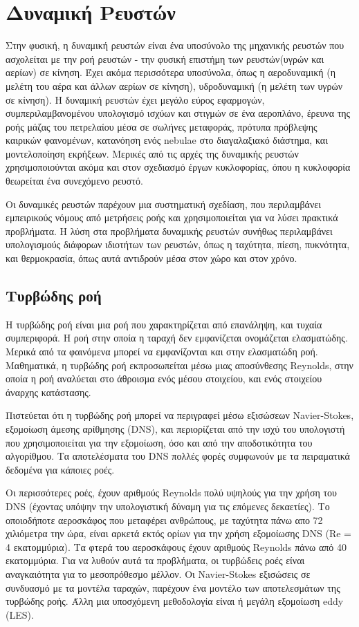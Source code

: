 \section{Δυναμική Ρευστών}
Στην φυσική, η δυναμική ρευστών είναι ένα υποσύνολο της μηχανικής ρευστών που ασχολείται με την ροή ρευστών - την φυσική επιστήμη των ρευστών(υγρών και αερίων) σε κίνηση. Έχει ακόμα περισσότερα υποσύνολα, όπως η αεροδυναμική (η μελέτη του αέρα και άλλων αερίων σε κίνηση), υδροδυναμική (η μελέτη των υγρών σε κίνηση). Η δυναμική ρευστών έχει μεγάλο εύρος εφαρμογών, συμπεριλαμβανομένου υπολογισμό ισχύων και στιγμών σε ένα αεροπλάνο, έρευνα της ροής μάζας του πετρελαίου μέσα σε σωλήνες μεταφοράς, πρότυπα πρόβλεψης καιρικών φαινομένων, κατανόηση ενός nebulae στο διαγαλαξιακό διάστημα, και μοντελοποίηση εκρήξεων. Μερικές από τις αρχές της δυναμικής ρευστών χρησιμοποιούνται ακόμα και στον σχεδιασμό έργων κυκλοφορίας, όπου η κυκλοφορία θεωρείται ένα συνεχόμενο ρευστό.

Οι δυναμικές ρευστών παρέχουν μια συστηματική σχεδίαση, που περιλαμβάνει εμπειρικούς νόμους από μετρήσεις ροής και χρησιμοποιείται για να λύσει πρακτικά προβλήματα. Η λύση στα προβλήματα δυναμικής ρευστών συνήθως περιλαμβάνει υπολογισμούς διάφορων ιδιοτήτων των ρευστών, όπως η ταχύτητα, πίεση, πυκνότητα, και θερμοκρασία, όπως αυτά αντιδρούν μέσα στον χώρο και στον χρόνο.
\subsection{Τυρβώδης ροή}
Η τυρβώδης ροή είναι μια ροή που χαρακτηρίζεται από επανάληψη, και τυχαία συμπεριφορά. Η ροή στην οποία η ταραχή δεν εμφανίζεται ονομάζεται ελασματώδης. Μερικά από τα φαινόμενα μπορεί να εμφανίζονται και στην ελασματώδη ροή. Μαθηματικά, η τυρβώδης ροή εκπροσωπείται μέσω μιας αποσύνθεσης Reynolds, στην οποία η ροή αναλύεται στο άθροισμα ενός μέσου στοιχείου, και ενός στοιχείου άναρχης κατάστασης.

Πιστεύεται ότι η τυρβώδης ροή μπορεί να περιγραφεί μέσω εξισώσεων Navier-Stokes, εξομοίωση άμεσης αρίθμησης (DNS), και περιορίζεται από την ισχύ του υπολογιστή που χρησιμοποιείται για την εξομοίωση, όσο και από την αποδοτικότητα του αλγορίθμου. Τα αποτελέσματα του DNS πολλές φορές συμφωνούν με τα πειραματικά δεδομένα για κάποιες ροές.

Οι περισσότερες ροές, έχουν αριθμούς Reynolds πολύ υψηλούς για την χρήση του DNS (έχοντας υπόψην την υπολογιστική δύναμη για τις επόμενες δεκαετίες). Το οποιοδήποτε αεροσκάφος που μεταφέρει ανθρώπους, με ταχύτητα πάνω απο 72 χιλιόμετρα την ώρα, είναι αρκετά εκτός ορίων για την χρήση εξομοίωσης DNS (Re = 4 εκατομμύρια). Τα φτερά του αεροσκάφους έχουν αριθμούς Reynolds πάνω από 40 εκατομμύρια. Για να λυθούν αυτά τα προβλήματα, οι τυρβώδεις ροές είναι αναγκαιότητα για το μεσοπρόθεσμο μέλλον. Οι Navier-Stokes εξισώσεις σε συνδυασμό με τα μοντέλα ταραχών, παρέχουν ένα μοντέλο των αποτελεσμάτων της τυρβώδης ροής. Άλλη μια υποσχόμενη μεθοδολογία είναι ή μεγάλη εξομοίωση eddy (LES).


